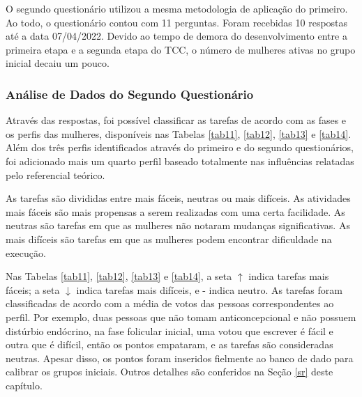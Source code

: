 O segundo questionário 
utilizou a mesma metodologia de aplicação do primeiro.
Ao todo, o questionário contou com 11 perguntas. Foram recebidas 10 respostas até a 
data 07/04/2022. Devido ao tempo de demora do desenvolvimento 
entre a primeira etapa e a segunda etapa do TCC, o número de mulheres ativas no grupo 
inicial decaiu um pouco. 


\newpage
\subsubsection{Análise de Dados do Segundo Questionário}
\label{vsf2}
Através das respostas, foi possível 
classificar as tarefas de acordo com as fases e os perfis das mulheres, disponíveis nas Tabelas \ref{tab11}, \ref{tab12}, \ref{tab13} e \ref{tab14}.
Além dos três perfis identificados através do primeiro e do segundo questionários, foi adicionado mais um quarto perfil 
baseado totalmente nas influências relatadas pelo referencial teórico. 

As tarefas são divididas entre mais fáceis, neutras ou mais difíceis. As atividades mais fáceis 
são mais propensas a serem realizadas com uma certa facilidade. As neutras são tarefas em que as mulheres não 
notaram mudanças significativas. As mais difíceis são tarefas em que as mulheres podem encontrar dificuldade 
na execução.

Nas Tabelas \ref{tab11}, \ref{tab12}, \ref{tab13} e \ref{tab14}, a seta $\uparrow$ indica tarefas mais fáceis; a seta $\downarrow$ indica tarefas mais difíceis, e - indica neutro. As tarefas 
foram classificadas de acordo com a média de votos das pessoas correspondentes ao perfil. Por exemplo, duas 
pessoas que não tomam anticoncepcional e não possuem distúrbio endócrino, na fase folicular inicial, 
uma votou que escrever é fácil e outra que é difícil, então os pontos empataram, e as tarefas são consideradas neutras.
Apesar disso, os pontos foram inseridos fielmente ao banco de dado para calibrar os grupos iniciais. Outros detalhes são conferidos
na Seção \ref{sr} deste capítulo.

